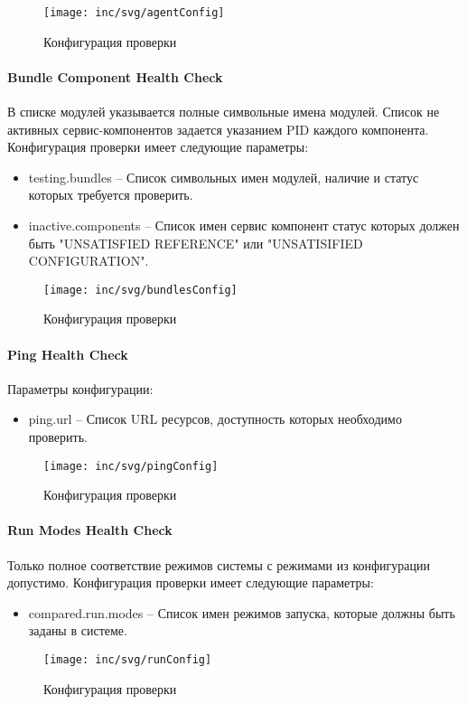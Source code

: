 \begin{figure}[H]
  \centering
  \texttt{[image: inc/svg/agentConfig]}
  \caption{Конфигурация проверки}
  \label{fig:agentConfig}
\end{figure}


\paragraph{Bundle Component Health Check}
В списке модулей указывается полные символьные имена модулей. Список не активных сервис-компонентов задается указанием PID каждого компонента.
Конфигурация проверки имеет следующие параметры:
\begin{itemize}
\item testing.bundles – Список символьных имен модулей, наличие и статус которых требуется проверить.
\item inactive.components – Список имен сервис компонент статус которых должен быть "UNSATISFIED REFERENCE" или "UNSATISIFIED CONFIGURATION".
\end{itemize}

\begin{figure}[H]
  \centering
  \texttt{[image: inc/svg/bundlesConfig]}
  \caption{Конфигурация проверки}
  \label{fig:bundlesConfig}
\end{figure}

\paragraph{Ping Health Check}
Параметры конфигурации:
\begin{itemize}
\item ping.url – Список URL ресурсов, доступность которых необходимо проверить.
\end{itemize}

\begin{figure}[H]
  \centering
  \texttt{[image: inc/svg/pingConfig]}
  \caption{Конфигурация проверки}
  \label{fig:pingConfig}
\end{figure}

\paragraph{Run Modes Health Check}
Только полное соответствие режимов системы с режимами из конфигурации допустимо. Конфигурация проверки имеет следующие параметры:
\begin{itemize}
\item compared.run.modes – Список имен режимов запуска, которые должны быть заданы в системе.
\end{itemize}

\begin{figure}[H]
  \centering
  \texttt{[image: inc/svg/runConfig]}
  \caption{Конфигурация проверки}
  \label{fig:runConfig}
\end{figure}

